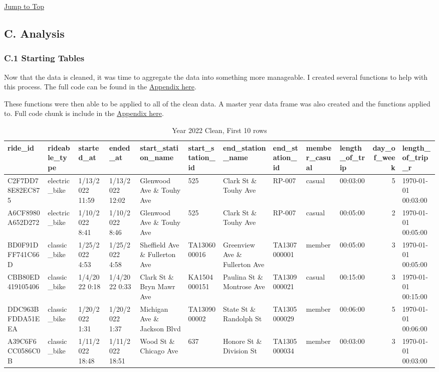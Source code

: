 \documentclass[
]{article}
\begin{document}
\protect\hyperlink{toc}{Jump to Top}

\hypertarget{c.-analysis}{%
\subsection{C. Analysis}\label{c.-analysis}}

\hypertarget{c.1-starting-tables}{%
\subsubsection{C.1 Starting Tables}\label{c.1-starting-tables}}

Now that the data is cleaned, it was time to aggregate the data into
something more manageable. I created several functions to help with this
process. The full code can be found in the
\protect\hyperlink{Appx1}{Appendix here}.

These functions were then able to be applied to all of the clean data. A
master year data frame was also created and the functions applied to.
Full code chunk is include in the \protect\hyperlink{Appx2}{Appendix
here}.

\begin{table}

\caption{\label{tab:Year 2022 Clean, First 6 rows}Year 2022 Clean, First 10 rows}
\centering
\begin{tabular}[t]{l|l|l|l|l|l|l|l|l|l|r|l}
\hline
ride\_id & rideable\_type & started\_at & ended\_at & start\_station\_name & start\_station\_id & end\_station\_name & end\_station\_id & member\_casual & length\_of\_trip & day\_of\_week & length\_of\_trip\_r\\
\hline
C2F7DD78E82EC875 & electric\_bike & 1/13/2022 11:59 & 1/13/2022 12:02 & Glenwood Ave \& Touhy Ave & 525 & Clark St \& Touhy Ave & RP-007 & casual & 00:03:00 & 5 & 1970-01-01 00:03:00\\
\hline
A6CF8980A652D272 & electric\_bike & 1/10/2022 8:41 & 1/10/2022 8:46 & Glenwood Ave \& Touhy Ave & 525 & Clark St \& Touhy Ave & RP-007 & casual & 00:05:00 & 2 & 1970-01-01 00:05:00\\
\hline
BD0F91DFF741C66D & classic\_bike & 1/25/2022 4:53 & 1/25/2022 4:58 & Sheffield Ave \& Fullerton Ave & TA1306000016 & Greenview Ave \& Fullerton Ave & TA1307000001 & member & 00:05:00 & 3 & 1970-01-01 00:05:00\\
\hline
CBB80ED419105406 & classic\_bike & 1/4/2022 0:18 & 1/4/2022 0:33 & Clark St \& Bryn Mawr Ave & KA1504000151 & Paulina St \& Montrose Ave & TA1309000021 & casual & 00:15:00 & 3 & 1970-01-01 00:15:00\\
\hline
DDC963BFDDA51EEA & classic\_bike & 1/20/2022 1:31 & 1/20/2022 1:37 & Michigan Ave \& Jackson Blvd & TA1309000002 & State St \& Randolph St & TA1305000029 & member & 00:06:00 & 5 & 1970-01-01 00:06:00\\
\hline
A39C6F6CC0586C0B & classic\_bike & 1/11/2022 18:48 & 1/11/2022 18:51 & Wood St \& Chicago Ave & 637 & Honore St \& Division St & TA1305000034 & member & 00:03:00 & 3 & 1970-01-01 00:03:00\\
\hline
\end{tabular}
\end{table}
\end{document}
